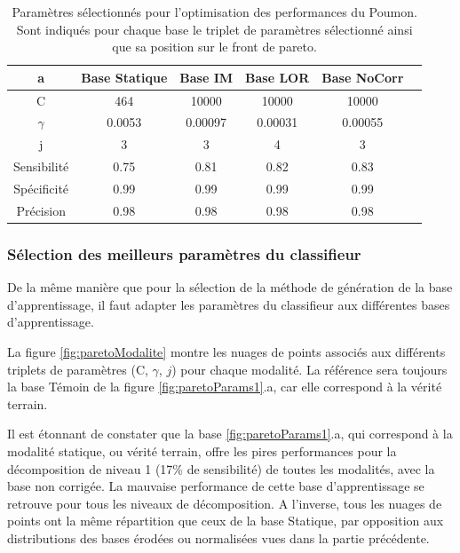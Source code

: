 \begin{table}[h!]
\label{fig:paramsModPoumon}
		\begin{tabular}{c| c c c c c}
  \hline
  a	& Base Statique	& Base IM	& Base LOR	& Base NoCorr	\\
  \hline
 C 	& 464		& 10000		& 10000		& 10000		\\
\hline
$\gamma$& 0.0053	& 0.00097	& 0.00031	& 0.00055	\\
\hline
j	& 3		& 3		& 4		& 3		\\
\hline
\hline
Sensibilité& 0.75	& 0.81		& 0.82		& 0.83	\\
\hline
Spécificité& 0.99	& 0.99		& 0.99		& 0.99		\\
\hline
Précision& 0.98		& 0.98		& 0.98		& 0.98		\\
\hline
 		\end{tabular}

\caption{Paramètres sélectionnés pour l'optimisation des performances du Poumon. Sont indiqués pour chaque base le triplet de paramètres sélectionné ainsi que sa position sur le front de pareto.}
\end{table}

\subsubsection{Sélection des meilleurs paramètres du classifieur}

De la même manière que pour la sélection de la méthode de génération de la base d'apprentissage, il faut adapter les paramètres du classifieur aux différentes bases d'apprentissage.

La figure \ref{fig:paretoModalite} montre les nuages de points associés aux différents triplets de paramètres (C, $\gamma$, $j$) pour chaque modalité. La référence sera toujours la base Témoin de la figure \ref{fig:paretoParams1}.a, car elle correspond à la vérité terrain.

Il est étonnant de constater que la base \ref{fig:paretoParams1}.a, qui correspond à la modalité statique, ou vérité terrain, offre les pires performances pour la décomposition de niveau 1 (17\% de sensibilité) de toutes les modalités, avec la base non corrigée. La mauvaise performance de cette base d'apprentissage se retrouve pour tous les niveaux de décomposition. A l'inverse, tous les nuages de points ont la même répartition que ceux de la base Statique, par opposition aux distributions des bases érodées ou normalisées vues dans la partie précédente.


